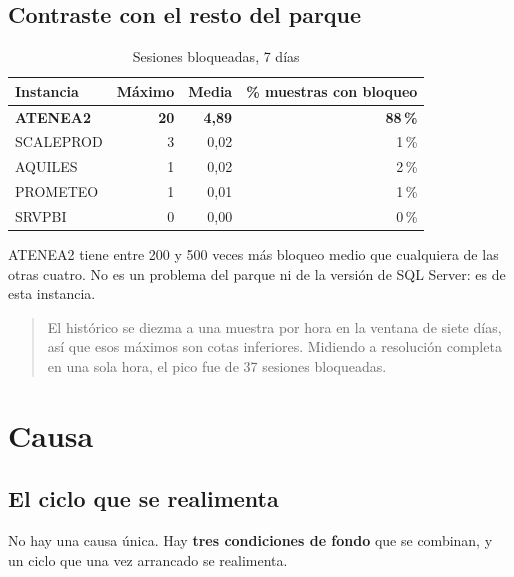 \documentclass[11pt,a4paper]{article}
\newcommand{\critico}[1]{\textcolor{rojo}{\textbf{#1}}}
\begin{document}
\subsection{Contraste con el resto del parque}

\begin{table}[h]
\centering
\small
\begin{tabular}{lrrr}
\toprule
\textbf{Instancia} & \textbf{Máximo} & \textbf{Media} &
\textbf{\% muestras con bloqueo} \\
\midrule
\critico{ATENEA2} & \critico{20} & \critico{4,89} & \critico{88\,\%} \\
SCALEPROD &  3 & 0,02 & 1\,\% \\
AQUILES   &  1 & 0,02 & 2\,\% \\
PROMETEO  &  1 & 0,01 & 1\,\% \\
SRVPBI    &  0 & 0,00 & 0\,\% \\
\bottomrule
\end{tabular}
\caption{Sesiones bloqueadas, 7 días}
\end{table}

ATENEA2 tiene entre 200 y 500 veces más bloqueo medio que cualquiera de las
otras cuatro. No es un problema del parque ni de la versión de SQL Server:
es de esta instancia.

\begin{quote}\small\color{gris}
El histórico se diezma a una muestra por hora en la ventana de siete días,
así que esos máximos son cotas inferiores. Midiendo a resolución completa
en una sola hora, el pico fue de 37 sesiones bloqueadas.
\end{quote}

\newpage
\section{Causa}

\subsection{El ciclo que se realimenta}

No hay una causa única. Hay \textbf{tres condiciones de fondo} que se
combinan, y un ciclo que una vez arrancado se realimenta.
\end{document}
